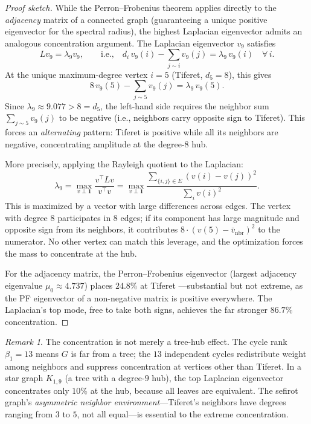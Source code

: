 \documentclass[11pt,a4paper]{amsart}
\theoremstyle{remark}
\newtheorem{remark}[theorem]{Remark}
\begin{document}
\begin{proof}[Proof sketch]
While the Perron--Frobenius theorem applies directly to the \emph{adjacency}
matrix of a connected graph (guaranteeing a unique positive eigenvector for
the spectral radius), the highest Laplacian eigenvector admits an analogous
concentration argument. The Laplacian eigenvector $v_9$ satisfies
\begin{equation}
L v_9 = \lambda_9 v_9, \qquad \text{i.e.,} \quad
d_i \, v_9(i) - \sum_{j \sim i} v_9(j) = \lambda_9 \, v_9(i)
\quad \forall \, i.
\end{equation}
At the unique maximum-degree vertex $i = 5$ (Tiferet, $d_5 = 8$), this gives
\begin{equation}
8 \, v_9(5) - \sum_{j \sim 5} v_9(j) = \lambda_9 \, v_9(5).
\end{equation}
Since $\lambda_9 \approx 9.077 > 8 = d_5$, the left-hand side requires the
neighbor sum $\sum_{j \sim 5} v_9(j)$ to be negative (i.e., neighbors carry
opposite sign to Tiferet). This forces an \emph{alternating} pattern: Tiferet
is positive while all its neighbors are negative, concentrating amplitude
at the degree-$8$ hub.

More precisely, applying the Rayleigh quotient to the Laplacian:
\begin{equation}
\lambda_9 = \max_{v \perp \mathbf{1}} \frac{v^\top L v}{v^\top v}
= \max_{v \perp \mathbf{1}} \frac{\sum_{\{i,j\} \in E} (v(i) - v(j))^2}{\sum_i v(i)^2}.
\end{equation}
This is maximized by a vector with large differences across edges. The
vertex with degree $8$ participates in $8$ edges; if its component has
large magnitude and opposite sign from its neighbors, it contributes
$8 \cdot (v(5) - \bar{v}_{\mathrm{nbr}})^2$ to the numerator. No other
vertex can match this leverage, and the optimization forces the mass to
concentrate at the hub.

For the adjacency matrix, the Perron--Frobenius eigenvector (largest
adjacency eigenvalue $\mu_0 \approx 4.737$) places $24.8\%$ at Tiferet
---substantial but not extreme, as the PF eigenvector of a non-negative
matrix is positive everywhere. The Laplacian's top mode, free to take both
signs, achieves the far stronger $86.7\%$ concentration.
\end{proof}

\begin{remark}
The concentration is not merely a tree-hub effect. The cycle rank
$\beta_1 = 13$ means $G$ is far from a tree; the $13$ independent cycles
redistribute weight among neighbors and suppress concentration at vertices
other than Tiferet. In a star graph $K_{1,9}$ (a tree with a degree-$9$
hub), the top Laplacian eigenvector concentrates only $10\%$ at the hub,
because all leaves are equivalent. The sefirot graph's \emph{asymmetric
neighbor environment}---Tiferet's neighbors have degrees ranging from $3$
to $5$, not all equal---is essential to the extreme concentration.
\end{remark}
\end{document}
